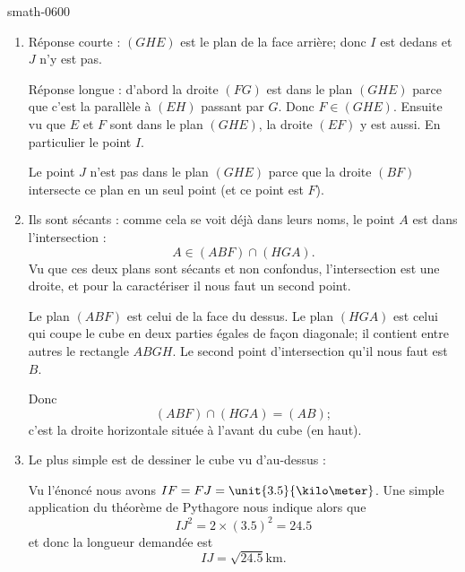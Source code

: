 
\begin{corrige}{smath-0600}

    \begin{enumerate}
        \item
            Réponse courte : \( (GHE)\) est le plan de la face arrière; donc \( I\) est dedans et \( J\) n'y est pas.

            Réponse longue : d'abord la droite \( (FG)\) est dans le plan \( (GHE)\) parce que c'est la parallèle à \( (EH)\) passant par \( G\). Donc \( F\in (GHE)\). Ensuite vu que \( E\) et \( F\) sont dans le plan \( (GHE)\), la droite \( (EF)\) y est aussi. En particulier le point \( I\).

            Le point \( J\) n'est pas dans le plan \( (GHE)\) parce que la droite \( (BF)\) intersecte ce plan en un seul point (et ce point est \( F\)).

        \item
            Ils sont sécants : comme cela se voit déjà dans leurs noms, le point \( A\) est dans l'intersection :
            \begin{equation}
                A\in (ABF)\cap(HGA).
            \end{equation}
            Vu que ces deux plans sont sécants et non confondus, l'intersection est une droite, et pour la caractériser il nous faut un second point.

            Le plan \( (ABF)\) est celui de la face du dessus. Le plan \( (HGA)\) est celui qui coupe le cube en deux parties égales de façon diagonale; il contient entre autres le rectangle \( ABGH\). Le second point d'intersection qu'il nous faut est \( B\).

            Donc
            \begin{equation}
                (ABF)\cap(HGA)=(AB);
            \end{equation}
            c'est la droite horizontale située à l'avant du cube (en haut).

        \item   \label{ItemECveWvo}
            Le plus simple est de dessiner le cube vu d'au-dessus :
            \begin{center}
                
            \end{center}
            Vu l'énoncé nous avons \( IF=FJ=\unit{3.5}{\kilo\meter}\). Une simple application du théorème de Pythagore nous indique alors que
            \begin{equation}
                IJ^2=2\times (3.5)^2=24.5
            \end{equation}
            et donc la longueur demandée est
            \begin{equation}
                IJ=\sqrt{24.5}\si{\kilo\meter}.
            \end{equation}
            
    \end{enumerate}

\end{corrige}
